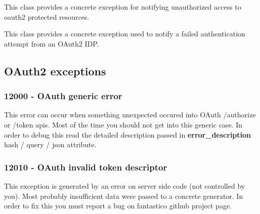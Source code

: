\documentclass[letterpaper,10pt,english]{sphinxmanual}
\begin{document}

\begin{fulllineitems}
\label{features/oauth2/technical_summary:fantastico.oauth2.exceptions.OAuth2UnauthorizedError}
This class provides a concrete exception for notifying unauthorized access to oauth2 protected resources.

\end{fulllineitems}


\begin{fulllineitems}
\label{features/oauth2/technical_summary:fantastico.oauth2.exceptions.OAuth2AuthenticationError}
This class provides a concrete exception used to notify a failed authentication attempt from an OAuth2 IDP.

\end{fulllineitems}



\subsection{OAuth2 exceptions}
\label{features/oauth2:oauth2-exceptions}

\subsubsection{12000 - OAuth generic error}
\label{features/oauth2/exceptions/12000:oauth-generic-error}\label{features/oauth2/exceptions/12000::doc}
This error can occur when something unexpected occured into OAuth /authorize or /token apis. Most of the time you should not
get into this generic case. In order to debug this read the detailed description passed in \textbf{error\_description} hash / query /
json attribute.


\subsubsection{12010 - OAuth invalid token descriptor}
\label{features/oauth2/exceptions/12010::doc}\label{features/oauth2/exceptions/12010:oauth-invalid-token-descriptor}
This exception is generated by an error on server side code (not controlled by you). Most probably insufficient data were
passed to a concrete generator. In order to fix this you must report a bug on fantastico github project page.
\end{document}
